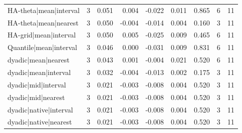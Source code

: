 \begin{tabular}{lrrrrrrrr}
HA-theta|mean|interval & 3 & 0.051 & 0.004 & -0.022 & 0.011 & 0.865 & 6 & 11 \\
HA-theta|mean|nearest & 3 & 0.050 & -0.004 & -0.014 & 0.004 & 0.160 & 3 & 11 \\
HA-grid|mean|interval & 3 & 0.050 & 0.005 & -0.025 & 0.009 & 0.465 & 6 & 11 \\
Quantile|mean|interval & 3 & 0.046 & 0.000 & -0.031 & 0.009 & 0.831 & 6 & 11 \\
dyadic|mean|nearest & 3 & 0.043 & 0.001 & -0.004 & 0.021 & 0.520 & 6 & 11 \\
dyadic|mean|interval & 3 & 0.032 & -0.004 & -0.013 & 0.002 & 0.175 & 3 & 11 \\
dyadic|mid|interval & 3 & 0.021 & -0.003 & -0.008 & 0.004 & 0.520 & 3 & 11 \\
dyadic|mid|nearest & 3 & 0.021 & -0.003 & -0.008 & 0.004 & 0.520 & 3 & 11 \\
dyadic|native|interval & 3 & 0.021 & -0.003 & -0.008 & 0.004 & 0.520 & 3 & 11 \\
dyadic|native|nearest & 3 & 0.021 & -0.003 & -0.008 & 0.004 & 0.520 & 3 & 11 \\
\bottomrule
\end{tabular}
